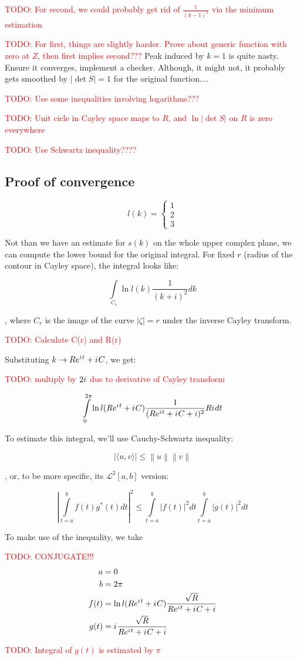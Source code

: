 \documentclass[12pt, a4paper]{article}
\newcommand{\abs}[1]{\left| #1 \right|}
\newcommand{\mcL}{\mathcal{L}}
\newcommand{\eexp}[1]{e^{#1}}
\newcommand{\iu}{{i\mkern1mu}}
\newcommand{\todo}[1]{{\large \textcolor{red}{TODO: #1}}}
\begin{document}
\todo{For second, we could probably get rid of $\frac{1}{(k-1)^2}$ via the minimum estimation}

\todo{For first, things are slightly harder. Prove about generic function with zero at $Z$, then first implies second???}
Peak induced by $k=1$ is quite nasty. Ensure it converges, implement a checker. Although, it might not, it probably gets smoothed by $\abs{\det S} = 1$ for the original function....


\todo{Use some inequalities involving logarithms???}

\todo{Unit cicle in Cayley space maps to $R$, and $\ln\abs{\det S}$ on $R$ is zero everywhere}

\todo{Use Schwartz inequality????}

\subsection*{Proof of convergence}

\[
l(k) =
\begin{cases}
1 \\
2 \\
3 
\end{cases}
\]

Not than we have an estimate for $s(k)$ on the whole upper complex plane, we can compute the lower bound for the original integral. For fixed $r$ (radius of the contour in Cayley space), the integral looks like:

\[
\int\limits_{C_r} \ln l(k) \frac{1}{(k + i)^2} dk
\]

, where $C_r$ is the image of the curve $\abs{\zeta} = r$ under the inverse Cayley transform.

\todo{Calculate C(r) and R(r)}

Substituting $k \to R \eexp{\iu t} + \iu C$, we get:

\todo{multiply by $2 \iu$ due to derivative of Cayley transform}

\[
\int\limits_{0}^{2 \pi} \ln l(R \eexp{\iu t} + \iu C) \frac{1}{(R \eexp{\iu t} + \iu C + i)^2} R \iu dt
\]

To estimate this integral, we'll use Cauchy-Schwartz inequality:

\[
\big| \langle u,v \rangle \big| \leq \left\|u\right\| \left\|v\right\|
\]

, or, to be more specific, its $\mcL^2[a, b]$ version:

\[
\abs{
\int\limits_{t=a}^{b} f(t) g^*(t) dt
}^2
\le
\int\limits_{t=a}^b \abs{f(t)}^2 dt 
\int\limits_{t=a}^b \abs{g(t)}^2 dt 
\]

To make use of the inequality, we take 

\todo{CONJUGATE!!!}
\begin{align*}
a    &= 0 \\
b    &= 2 \pi \\
f(t) &= \ln l(R \eexp{\iu t} + \iu C) \frac{\sqrt{R}}{R \eexp{\iu t} + \iu C + i} \\
g(t) &= \iu \frac{\sqrt{R}}{R \eexp{\iu t} + \iu C + i}
\end{align*}

\todo{Integral of $g(t)$ is estimated by $\pi$}
\end{document}
